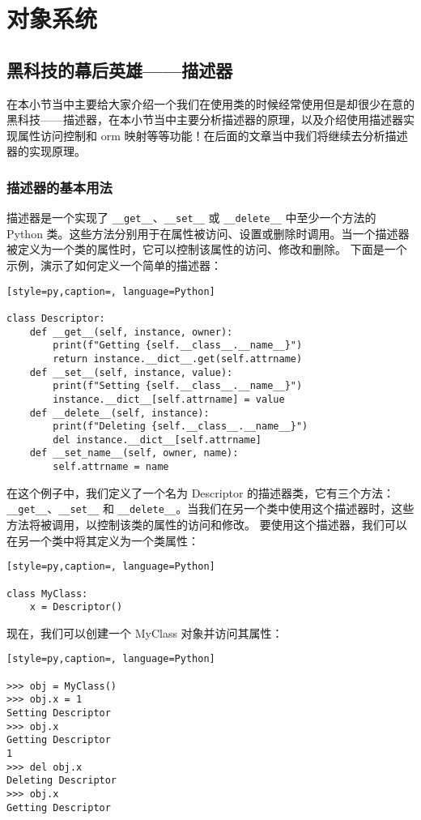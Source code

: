 \chapter{对象系统}
\section{黑科技的幕后英雄——描述器}
在本小节当中主要给大家介绍一个我们在使用类的时候经常使用但是却很少在意的黑科技——描述器，在本小节当中主要分析描述器的原理，以及介绍使用描述器实现属性访问控制和 orm 映射等等功能！在后面的文章当中我们将继续去分析描述器的实现原理。
\subsection{描述器的基本用法}
描述器是一个实现了 \verb|__get__|、\verb|__set__| 或 \verb|__delete__| 中至少一个方法的 Python 类。这些方法分别用于在属性被访问、设置或删除时调用。当一个描述器被定义为一个类的属性时，它可以控制该属性的访问、修改和删除。
下面是一个示例，演示了如何定义一个简单的描述器：
\begin{lstlisting}[style=py,caption=, language=Python]

class Descriptor:
    def __get__(self, instance, owner):
        print(f"Getting {self.__class__.__name__}")
        return instance.__dict__.get(self.attrname)
    def __set__(self, instance, value):
        print(f"Setting {self.__class__.__name__}")
        instance.__dict__[self.attrname] = value
    def __delete__(self, instance):
        print(f"Deleting {self.__class__.__name__}")
        del instance.__dict__[self.attrname]
    def __set_name__(self, owner, name):
        self.attrname = name
\end{lstlisting}
在这个例子中，我们定义了一个名为 Descriptor 的描述器类，它有三个方法：\verb|__get__|、\verb|__set__| 和 \verb|__delete__|。当我们在另一个类中使用这个描述器时，这些方法将被调用，以控制该类的属性的访问和修改。
要使用这个描述器，我们可以在另一个类中将其定义为一个类属性：
\begin{lstlisting}[style=py,caption=, language=Python]

class MyClass:
    x = Descriptor()
\end{lstlisting}
现在，我们可以创建一个 MyClass 对象并访问其属性：
\begin{lstlisting}[style=py,caption=, language=Python]

>>> obj = MyClass()
>>> obj.x = 1
Setting Descriptor
>>> obj.x
Getting Descriptor
1
>>> del obj.x
Deleting Descriptor
>>> obj.x
Getting Descriptor
\end{lstlisting}
